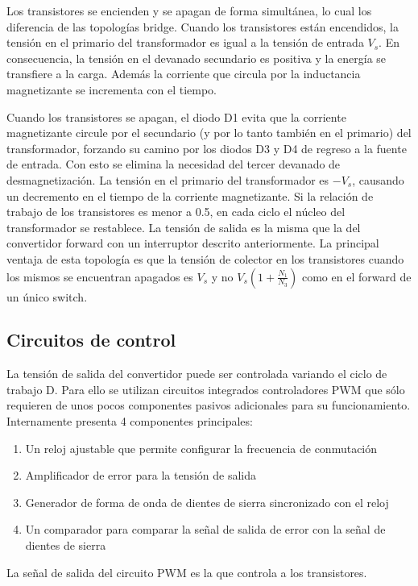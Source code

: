 Los transistores se encienden y se apagan de forma simultánea, lo cual los diferencia de las topologías bridge. 
Cuando los transistores están encendidos, la tensión en el primario del transformador es igual a la tensión de entrada $V_s$. 
En consecuencia, la tensión en el devanado secundario es positiva y la energía se transfiere a la carga. 
Además la corriente que circula por la inductancia magnetizante se incrementa con el tiempo. 

Cuando los transistores se apagan, el diodo D1 evita que la corriente magnetizante circule por el secundario 
(y por lo tanto también en el primario) del transformador, forzando su camino por los diodos D3 y D4 de regreso a la fuente de entrada.  
Con esto se elimina la necesidad del tercer devanado de desmagnetización. 
La tensión en el primario del transformador es $-V_s$, causando un decremento en el tiempo de la corriente magnetizante. 
Si la relación de trabajo de los transistores es menor a 0.5, en cada ciclo el núcleo del transformador se restablece.
La tensión de salida es la misma que la del convertidor forward con un interruptor descrito anteriormente.
La principal ventaja de esta topología es que la tensión de colector en los transistores cuando los mismos se encuentran apagados 
es $V_s$ y no $V_s\left(1+\frac{N_1}{N_3}\right)$ como en el forward de un único switch.

\subsection{Circuitos de control}

La tensión de salida del convertidor puede ser controlada variando el ciclo de trabajo D. 
Para ello se utilizan circuitos integrados controladores PWM que sólo requieren de unos pocos componentes pasivos adicionales para su funcionamiento. 
Internamente presenta 4 componentes principales:
\begin{enumerate}
    \item Un reloj ajustable que permite configurar la frecuencia de conmutación
    \item Amplificador de error para la tensión de salida
    \item Generador de forma de onda de dientes de sierra sincronizado con el reloj
    \item Un comparador para comparar la señal de salida de error con la señal de dientes de sierra
\end{enumerate}

La señal de salida del circuito PWM es la que controla a los transistores. 

